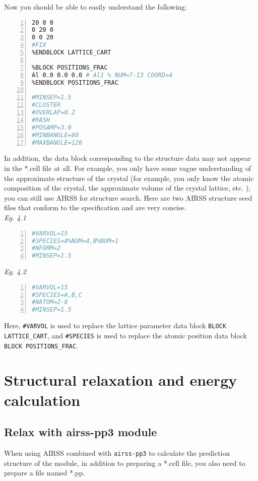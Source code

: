 \documentclass[a4paper, 10pt]{article}
\begin{document}
\newpage
Now you should be able to easily understand the following:

\begin{lstlisting}[language={bash},numbers=left]
%BLOCK LATTICE_CART
20 0 0
0 20 0
0 0 20
#FIX
%ENDBLOCK LATTICE_CART

%BLOCK POSITIONS_FRAC
Al 0.0 0.0 0.0 # Al1 % NUM=7-13 COORD=4
%ENDBLOCK POSITIONS_FRAC

#MINSEP=1.5
#CLUSTER
#OVERLAP=0.2
#RASH
#POSAMP=3.0
#MINBANGLE=80
#MAXBANGLE=120
\end{lstlisting}

In addition, the data block corresponding to the structure data may not appear in the *.cell file at all. For example, you only have some vague understanding of the approximate structure of the crystal (for example, you only know the atomic composition of the crystal, the approximate volume of the crystal lattice, etc. ), you can still use AIRSS for structure search. Here are two AIRSS structure seed files that conform to the specification and are very concise.\\
\emph{Eg. 4.1}
\begin{lstlisting}[language={bash},numbers=left]
#VARVOL=15
#SPECIES=A%NUM=4,B%NUM=1
#NFORM=2 
#MINSEP=1.5
\end{lstlisting}
\emph{Eg. 4.2}
\begin{lstlisting}[language={bash},numbers=left]
#VARVOL=15 
#SPECIES=A,B,C
#NATOM=2-8
#MINSEP=1.5        
\end{lstlisting}

Here, \verb|#VARVOL| is used to replace the lattice parameter data block \verb|BLOCK LATTICE_CART|, and \verb|#SPECIES| is used to replace the atomic position data block \verb|BLOCK POSITIONS_FRAC|.

\newpage
\section{Structural relaxation and energy calculation}

\subsection{Relax with airss-pp3 module}
When using AIRSS combined with \verb|airss-pp3| to calculate the prediction structure of the module, in addition to preparing a *.cell file, you also need to prepare a file named *.pp.
\end{document}

